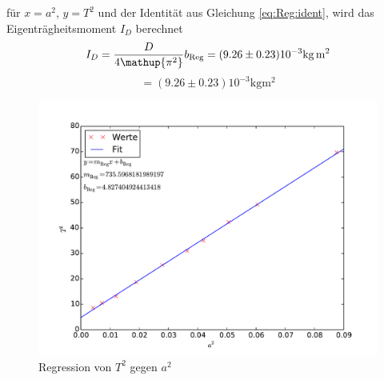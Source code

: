 für $x=a^2$, $y=T^2$ und der Identität aus Gleichung \eqref{eq:Reg:ident}, wird das Eigenträgheitsmoment $I_D$ berechnet
\begin{equation*}
	I_D= \frac{D}{4\mathup{\pi^2}}b_{\text{Reg}}\\
	   = (9.26\pm0.23)10^{-3} \si{\kilo\gram\meter\squared}
\end{equation*}
\begin{equation}
	= (9.26\pm0.23)10^{-3} \si{\kilo\gram\meter\squared}
\end{equation}
\begin{figure}[hp]
	\centering
	\label{fig:Regress}
	\includegraphics[width=\textwidth]{Bilder/Messung2.pdf}
	\caption{Regression von $T^2$ gegen $a^2$}
\end{figure}
\newpage



